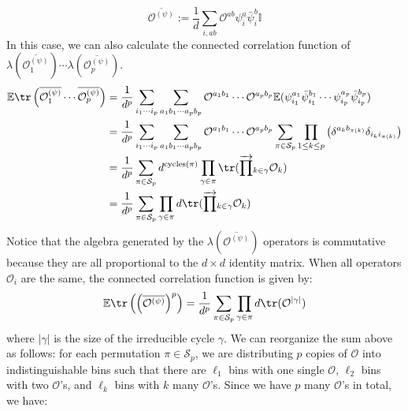 \documentclass[a4paper,11pt]{article}
\theoremstyle{definition}
\numberwithin{equation}{section}
\newcommand{\lb}{\left(}
\newcommand{\rb}{\right)}
\begin{document}
\begin{enumerate}
    \begin{equation}
        \overline{\mathcal{O}^{(\psi)}} := \frac{1}{d}\sum_{i,ab}\mathcal{O}^{ab}\psi^a_i\bar{\psi}^b_i\mathbb{I}
    \end{equation}
    In this case, we can also calculate the connected correlation function of $\lambda(\overline{\mathcal{O}_1^{(\psi)}})\cdots\lambda(\overline{\mathcal{O}_p^{(\psi)}})$. 
    \begin{align}
        \begin{split}
            \mathbb{E}\tr\lb\overline{\mathcal{O}_1^{(\psi)}}\cdots\overline{\mathcal{O}_p^{(\psi)}}\rb &= \frac{1}{d^p}\sum_{i_1\cdots i_p}\sum_{a_1b_1\cdots a_pb_p}\mathcal{O}^{a_1b_1}\cdots\mathcal{O}^{a_pb_p}\mathbb{E}(\psi^{a_1}_{i_1}\bar{\psi}^{b_1}_{i_1}\cdots\psi^{a_p}_{i_p}\bar{\psi}^{b_p}_{i_p})
            \\&=\frac{1}{d^p}\sum_{i_1\cdots i_p}\sum_{a_1b_1\cdots a_pb_p}\mathcal{O}^{a_1b_1}\cdots\mathcal{O}^{a_pb_p}\sum_{\pi\in\mathcal{S}_p}\prod_{1\leq k\leq p}\lb\delta^{a_kb_{\pi(k)}}\delta_{i_ki_{\pi(k)}}\rb
            \\&
            =\frac{1}{d^p}\sum_{\pi\in\mathcal{S}_p}d^{\text{cycles}(\pi)}\prod_{\gamma\in\pi}\tr(\overrightarrow{\prod}_{k\in \gamma}\mathcal{O}_k)
            \\&= \frac{1}{d^p}\sum_{\pi\in\mathcal{S}_p}\prod_{\gamma\in\pi}d\tr(\overrightarrow{\prod}_{k\in\gamma}\mathcal{O}_k)
        \end{split}
    \end{align}
    Notice that the algebra generated by the $\lambda(\overline{\mathcal{O}^{(\psi)}})$ operators is commutative because they are all proportional to the $d\times d$ identity matrix. When all operators $\mathcal{O}_i$ are the same, the connected correlation function is given by:
    \begin{equation}
        \mathbb{E}\tr\lb\lb\overline{\mathcal{O}^{(\psi)}}\rb^p\rb = \frac{1}{d^p}\sum_{\pi\in\mathcal{S}_p}\prod_{\gamma\in\pi}d\tr(\mathcal{O}^{|\gamma|})
    \end{equation}
    where $|\gamma|$ is the size of the irreducible cycle $\gamma$. We can reorganize the sum above as follows: for each permutation $\pi\in\mathcal{S}_p$, we are distributing $p$ copies of $\mathcal{O}$ into indistinguishable bins such that there are $\ell_1$ bins with one single $\mathcal{O}$, $\ell_2$ bins with two $\mathcal{O}$'s, and $\ell_k$ bins with $k$ many $\mathcal{O}$'s. Since we have $p$ many $\mathcal{O}$'s in total, we have:
    \begin{equation}

\end{equation}
\end{enumerate}
\end{document}
